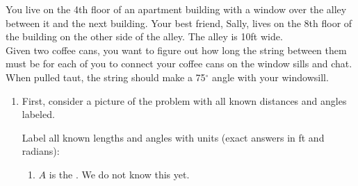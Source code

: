 \documentclass{ximera}
\author{Elizabeth Campolongo}
\begin{document}
\begin{exercise}

You live on the 4th floor of an apartment building with a window over the alley between it and the next building. Your best friend, Sally, lives on the 8th floor of the building on the other side of the alley.
The alley is 10ft wide. \\
Given two coffee cans, you want to figure out how long the string between them must be for each of you to connect your coffee cans on the window sills and chat. When pulled taut, the string should make a 75$^\circ$ angle with your windowsill. 
%
\begin{enumerate}

\item
First, consider a picture of the problem with all known distances and angles labeled.

		\begin{image}[2in]
		\end{image}

Label all known lengths and angles with units (exact answers in ft and radians):
\begin{enumerate}
\item $A$ is the . We do not know this yet.


\end{enumerate}
\end{enumerate}
\end{exercise}
\end{document}
